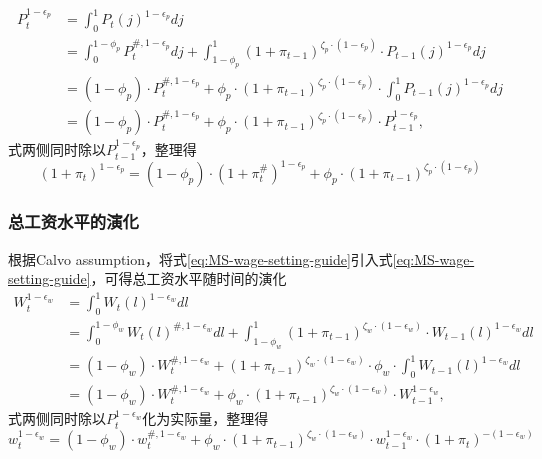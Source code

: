 \begin{equation*}
\begin{split}
P_t^{1-\epsilon_p} &= \int_0^1 P_t(j)^{1-\epsilon_p} dj \\
&= \int_0^{1-\phi_p} P_t^{\#, 1-\epsilon_p} dj + \int_{1-\phi_p}^{1} \left(1+\pi_{t-1}\right)^{\zeta_p \cdot \left(1-\epsilon_p \right)} \cdot P_{t-1}(j)^{1-\epsilon_p} dj\\
&=\left(1-\phi_p \right) \cdot P_t^{\#, 1-\epsilon_p} + \phi_p \cdot \left(1+\pi_{t-1}\right)^{\zeta_p \cdot \left(1-\epsilon_p\right)} \cdot \int_0^1 P_{t-1}(j)^{1-\epsilon_p} dj\\
&=\left(1-\phi_p \right) \cdot P_t^{\#, 1-\epsilon_p} + \phi_p \cdot \left(1+\pi_{t-1}\right)^{\zeta_p \cdot \left(1-\epsilon_p\right)} \cdot P_{t-1}^{1-\epsilon_p},
\end{split}
\end{equation*}
式两侧同时除以$P_{t-1}^{1-\epsilon_p}$，整理得
\begin{equation}
\label{eq:MS-agg-price-index-evolution}
\left(1+\pi_t\right)^{1-\epsilon_p} = \left(1-\phi_p\right) \cdot \left(1+\pi_t^{\#}\right)^{1-\epsilon_p} + \phi_p \cdot \left(1+\pi_{t-1}\right)^{\zeta_p \cdot \left(1-\epsilon_p\right)}
\end{equation}

\subsubsection{总工资水平的演化}
根据Calvo assumption\citep{Calvo:1983uqa}，将式\eqref{eq:MS-wage-setting-guide}引入式\eqref{eq:MS-wage-setting-guide}，可得总工资水平随时间的演化
\begin{equation*}
\begin{split}
W_t^{1-\epsilon_w} &= \int_0^1 W_t(l)^{1-\epsilon_w} dl \\
&=\int_0^{1-\phi_w} W_t(l)^{\#, 1-\epsilon_w} dl+ \int_{1-\phi_w}^{1} \left(1+\pi_{t-1}\right)^{\zeta_w \cdot \left(1-\epsilon_w\right)} \cdot W_{t-1}(l)^{1-\epsilon_w} dl \\
&= \left(1-\phi_w \right) \cdot W_t^{\#, 1-\epsilon_w} + \left(1+\pi_{t-1}\right)^{\zeta_w \cdot \left(1-\epsilon_w\right)} \cdot \phi_w \cdot  \int_0^1 W_{t-1}(l)^{1-\epsilon_w} dl \\
&=\left(1-\phi_w \right) \cdot W_t^{\#, 1-\epsilon_w} + \phi_w \cdot \left(1+\pi_{t-1}\right)^{\zeta_w \cdot \left(1-\epsilon_w\right)} \cdot W_{t-1}^{1-\epsilon_w},
\end{split}
\end{equation*}
式两侧同时除以$P_t^{1-\epsilon_w}$化为实际量，整理得
\begin{equation}
\label{eq:MS-agg-wage-index-evolution}
w_t^{1-\epsilon_w} = \left( 1-\phi_w \right) \cdot w_t^{\#, 1-\epsilon_w} + \phi_w \cdot \left(1+\pi_{t-1}\right)^{\zeta_w \cdot \left(1-\epsilon_w\right)} \cdot w_{t-1}^{1-\epsilon_w} \cdot \left(1 + \pi_t\right)^{- \left(1 - \epsilon_w \right)}
\end{equation}

